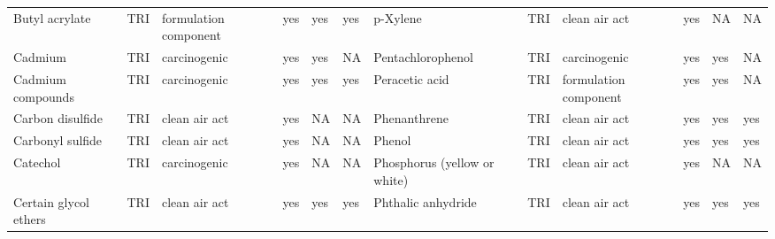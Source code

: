 \begin{table}[H]
{\begin{tabular}{llllllllllll}
            Butyl acrylate                                                             & TRI            & formulation component & yes    & yes     & yes  & p-Xylene                                                                                                           & TRI            & clean air act         & yes & NA & NA\\
            Cadmium                                                                    & TRI            & carcinogenic          & yes    & yes     & NA   & Pentachlorophenol                                                                                                  & TRI            & carcinogenic          & yes    & yes     & NA   \\
            Cadmium compounds                                                          & TRI            & carcinogenic          & yes    & yes     & yes  & Peracetic acid                                                                                                     & TRI            & formulation component & yes & yes & NA\\
            Carbon disulfide                                                           & TRI            & clean air act         & yes    & NA      & NA   & Phenanthrene                                                                                                       & TRI            & clean air act         & yes    & yes & yes\\
            Carbonyl sulfide                                                           & TRI            & clean air act         & yes    & NA      & NA   & Phenol                                                                                                             & TRI            & clean air act         & yes    & yes     & yes  \\
            Catechol                                                                   & TRI            & carcinogenic          & yes    & NA      & NA   & Phosphorus (yellow or white)                                                                                       & TRI            & clean air act & yes & NA & NA\\
            Certain glycol ethers                                                      & TRI            & clean air act         & yes    & yes     & yes  & Phthalic anhydride                                                                                                 & TRI            & clean air act & yes & yes & yes\\

\end{tabular}}
\end{table}
